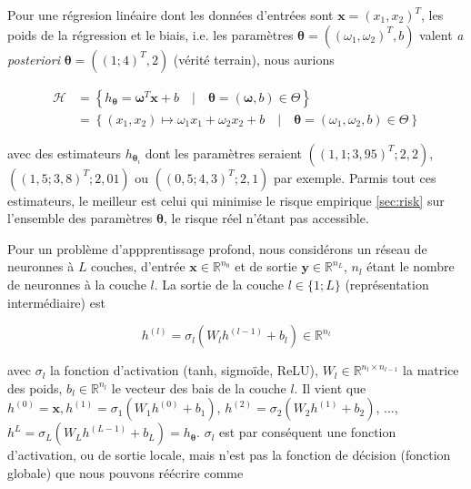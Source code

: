 \noindent Pour une régresion linéaire dont les données d'entrées sont $\boldsymbol{x} = (x_1, x_2)^T$, les poids de la régression et le biais, i.e. les paramètres $\boldsymbol{\theta} = ((\omega_1, \omega_2)^T, b)$ valent 
\textit{a posteriori} $\boldsymbol{\theta} = (( 1 ; 4)^T, 2)$ (vérité terrain), nous aurions 

\begin{align}
    \mathcal{H} &= \left\{ h_{\boldsymbol{\theta}} = \boldsymbol{\omega}^T \boldsymbol{x} + b \quad | \quad \boldsymbol{\theta} = (\boldsymbol{\omega}, b) \in \Theta \right\}    \nonumber \\
                &= \left\{ (x_1, x_2) \mapsto \omega_1 x_1 + \omega_2 x_2 + b \quad | \quad \boldsymbol{\theta} = (\omega_1, \omega_2, b) \in \Theta \right\}                     \nonumber
\end{align}

\noindent avec des estimateurs $h_{\boldsymbol{\theta}_i}$ dont les paramètres seraient $((1,1 ; 3,95)^T; 2,2)$, $((1,5; 3,8)^T; 2,01)$ ou $((0,5; 4,3)^T; 2,1)$ par exemple. Parmis tout ces estimateurs, le meilleur est celui qui minimise 
le risque empirique \ref{sec:risk} sur l'ensemble des paramètres $\boldsymbol{\theta}$, le risque réel n'étant pas accessible. 

\newpage

\noindent Pour un problème d'appprentissage profond, nous considérons un réseau de neuronnes à $L$ couches, d'entrée $\boldsymbol{x} \in \mathbb{R}^{n_0}$ et de sortie $\boldsymbol{y} \in \mathbb{R}^{n_L}$, $n_l$ étant le nombre de neuronnes 
à la couche $l$. La sortie de la couche $l \in \{1;L\}$ (représentation intermédiaire) est 

\begin{equation}
    h^{(l)} = \sigma_l \left( W_l h^{(l-1)} + b_l \right) \in \mathbb{R}^{n_l} \nonumber
\end{equation}

\vspace{1em}

\noindent avec $\sigma_l$ la fonction d'activation (tanh, sigmoïde, ReLU), $W_l \in \mathbb{R}^{n_l \times n_{l-1}}$ la matrice des poids, $b_l \in \mathbb{R}^{n_l}$ le vecteur des bais de la couche $l$.
Il vient que $h^{(0)} = \boldsymbol{x}, h^{(1)} = \sigma_{1} \left( W_1 h^{(0)} + b_1 \right)$, $ h^{(2)} = \sigma_{2} \left( W_2 h^{(1)} + b_2 \right)$, ..., $h^{L} = \sigma_{L} \left( W_L h^{(L-1)} + b_L \right) = h_{\boldsymbol{\theta}}$. 
$\sigma_l$ est par conséquent une fonction d'activation, ou de sortie locale, mais n'est pas la fonction de décision (fonction globale) que nous pouvons réécrire comme 

